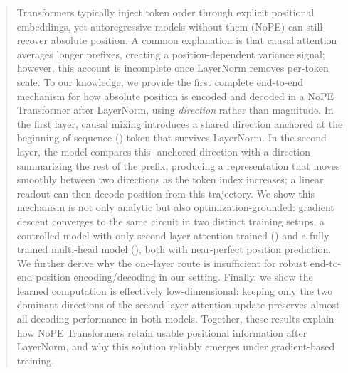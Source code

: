\documentclass{article}
\theoremstyle{plain}
\theoremstyle{definition}
\theoremstyle{remark}
\begin{document}


\begin{abstract}
Transformers typically inject token order through explicit positional embeddings, yet autoregressive models without them (NoPE) can still recover absolute position.
A common explanation is that causal attention averages longer prefixes, creating a position-dependent variance signal; however, this account is incomplete once LayerNorm removes per-token scale.
To our knowledge, we provide the first complete end-to-end mechanism for how absolute position is encoded and decoded in a NoPE Transformer after LayerNorm, using \emph{direction} rather than magnitude.
In the first layer, causal mixing introduces a shared direction anchored at the beginning-of-sequence (\bos) token that survives LayerNorm.
In the second layer, the model compares this \bos-anchored direction with a direction summarizing the rest of the prefix, producing a representation that moves smoothly between two directions as the token index increases; a linear readout can then decode position from this trajectory.
We show this mechanism is not only analytic but also optimization-grounded: gradient descent converges to the same circuit in two distinct training setups, a controlled model with only second-layer attention trained (\modelminimal) and a fully trained multi-head model (\modelfull), both with near-perfect position prediction.
We further derive why the one-layer route is insufficient for robust end-to-end position encoding/decoding in our setting.
Finally, we show the learned computation is effectively low-dimensional: keeping only the two dominant directions of the second-layer attention update preserves almost all decoding performance in both models.
Together, these results explain how NoPE Transformers retain usable positional information after LayerNorm, and why this solution reliably emerges under gradient-based training.
\end{abstract}
\end{document}
